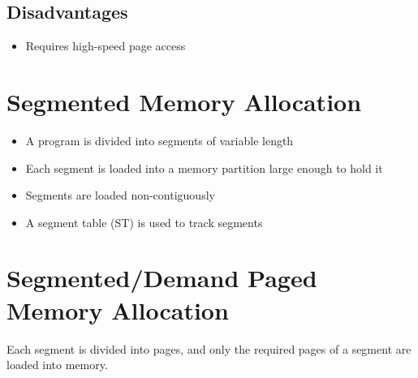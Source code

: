 \documentclass[12pt letter]{report}
\begin{document}
\subsection{Disadvantages}
\begin{itemize}
  \item Requires high-speed page access
\end{itemize}

\section{Segmented Memory Allocation}


\begin{itemize}
  \item A program is divided into segments of variable length
  \item Each segment is loaded into a memory partition large enough to hold it
  \item Segments are loaded non-contiguously
  \item A segment table (ST) is used to track segments
\end{itemize}

\section{Segmented/Demand Paged Memory Allocation}

Each segment is divided into pages, and only the required pages of a segment are loaded into memory.
\end{document}
